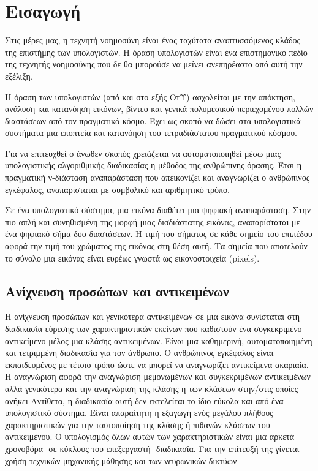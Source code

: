 \chapter{Εισαγωγή}\label{ch:introduction}

Στις μέρες μας, η τεχνητή νοημοσύνη είναι ένας ταχύτατα αναπτυσσόμενος κλάδος
της επιστήμης των υπολογιστών. Η όραση υπολογιστών είναι ένα επιστημονικό πεδίο
της τεχνητής νοημοσύνης που δε θα μπορούσε να μείνει ανεπηρέαστο από αυτή την
εξέλιξη.

Η όραση των υπολογιστών (από και στο εξής ΟτΥ) ασχολείται με την απόκτηση,
ανάλυση και κατανόηση εικόνων, βίντεο και γενικά πολυμεσικού περιεχομένου
πολλών διαστάσεων από τον πραγματικό κόσμο. Έχει ως σκοπό να δώσει στα
υπολογιστικά συστήματα μια εποπτεία και κατανόηση του τετραδιάστατου
πραγματικού κόσμου.

Για να επιτευχθεί ο άνωθεν σκοπός χρειάζεται να αυτοματοποιηθεί μέσω μιας
υπολογιστικής αλγοριθμικής διαδικασίας η μέθοδος της ανθρώπινης όρασης. Έτσι
η πραγματική ν-διάσταση αναπαράσταση που απεικονίζει και αναγνωρίζει ο
ανθρώπινος εγκέφαλος, αναπαρίσταται με συμβολικό και αριθμητικό τρόπο.

Σε ένα υπολογιστικό σύστημα, μια εικόνα διαθέτει μια ψηφιακή αναπαράσταση. Στην πιο
απλή και συνηθισμένη της μορφή μιας δισδιάστατης εικόνας, αναπαρίσταται με ένα
ψηφιακό σήμα δυο διαστάσεων. Η τιμή του σήματος σε κάθε σημείο του επιπέδου
αφορά την τιμή του χρώματος της εικόνας στη θέση αυτή. Τα σημεία που αποτελούν το
σύνολο μια εικόνας είναι ευρέως γνωστά ως εικονοστοιχεία (pixels).

\section{Ανίχνευση προσώπων και αντικειμένων}
Η ανίχνευση προσώπων και γενικότερα αντικειμένων σε μια εικόνα συνίσταται στη
διαδικασία εύρεσης των χαρακτηριστικών εκείνων που καθιστούν ένα συγκεκριμένο
αντικείμενο μέλος μια κλάσης αντικειμένων. Είναι μια καθημερινή, αυτοματοποιημένη
και τετριμμένη διαδικασία για τον άνθρωπο. Ο ανθρώπινος εγκέφαλος είναι
εκπαιδευμένος με τέτοιο τρόπο ώστε να μπορεί να αναγνωρίζει αντικείμενα ακαριαία.
Η αναγνώριση  αφορά την αναγνώριση μεμονωμένων και συγκεκριμένων αντικειμένων
αλλά γενικότερα και την αναγνώριση της κλάσης η των κλάσεων στην/στις οποίες ανήκει
Αντίθετα, η διαδικασία αυτή δεν εκτελείται το ίδιο εύκολα και από ένα υπολογιστικό σύστημα.
Είναι απαραίτητη η εξαγωγή ενός μεγάλου πλήθους χαρακτηριστικών για την ταυτοποίηση
της κλάσης ή πιθανών κλάσεων του αντικειμένου. Ο υπολογισμός όλων αυτών των
χαρακτηριστικών είναι μια αρκετά χρονοβόρα -σε κύκλους του επεξεργαστή- διαδικασία.
Για την επίτευξή της γίνεται χρήση τεχνικών μηχανικής μάθησης και των νευρωνικών δικτύων

